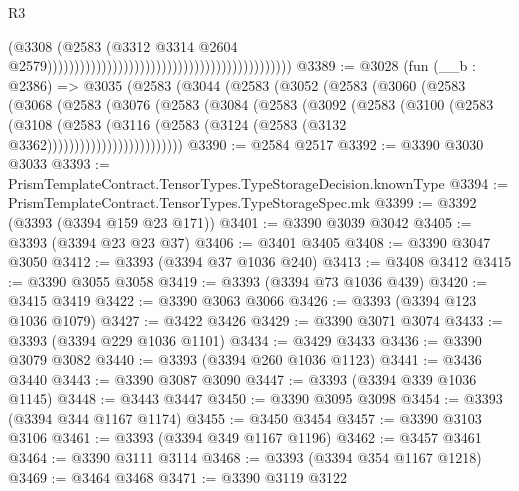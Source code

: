 \begin{lexlean}{R3}
\begin{coremodule}
                                                                                        (@3308
                                                                                          (@2583
                                                                                            (@3312
                                                                                              @3314
                                                                                              @2604
                                                                                              @2579)))))))))))))))))))))))))))))))))))))))))))))
@3389 := @3028
    (fun (__b : @2386) =>
    @3035
      (@2583
        (@3044
          (@2583
            (@3052
              (@2583
                (@3060
                  (@2583
                    (@3068
                      (@2583
                        (@3076
                          (@2583
                            (@3084
                              (@2583
                                (@3092
                                  (@2583
                                    (@3100
                                      (@2583
                                        (@3108
                                          (@2583
                                            (@3116
                                              (@2583
                                                (@3124 (@2583 (@3132 @3362)))))))))))))))))))))))))
@3390 := @2584 @2517
@3392 := @3390 @3030 @3033
@3393 := PrismTemplateContract.TensorTypes.TypeStorageDecision.knownType
@3394 := PrismTemplateContract.TensorTypes.TypeStorageSpec.mk
@3399 := @3392 (@3393 (@3394 @159 @23 @171))
@3401 := @3390 @3039 @3042
@3405 := @3393 (@3394 @23 @23 @37)
@3406 := @3401 @3405
@3408 := @3390 @3047 @3050
@3412 := @3393 (@3394 @37 @1036 @240)
@3413 := @3408 @3412
@3415 := @3390 @3055 @3058
@3419 := @3393 (@3394 @73 @1036 @439)
@3420 := @3415 @3419
@3422 := @3390 @3063 @3066
@3426 := @3393 (@3394 @123 @1036 @1079)
@3427 := @3422 @3426
@3429 := @3390 @3071 @3074
@3433 := @3393 (@3394 @229 @1036 @1101)
@3434 := @3429 @3433
@3436 := @3390 @3079 @3082
@3440 := @3393 (@3394 @260 @1036 @1123)
@3441 := @3436 @3440
@3443 := @3390 @3087 @3090
@3447 := @3393 (@3394 @339 @1036 @1145)
@3448 := @3443 @3447
@3450 := @3390 @3095 @3098
@3454 := @3393 (@3394 @344 @1167 @1174)
@3455 := @3450 @3454
@3457 := @3390 @3103 @3106
@3461 := @3393 (@3394 @349 @1167 @1196)
@3462 := @3457 @3461
@3464 := @3390 @3111 @3114
@3468 := @3393 (@3394 @354 @1167 @1218)
@3469 := @3464 @3468
@3471 := @3390 @3119 @3122

\end{coremodule}
\end{lexlean}
